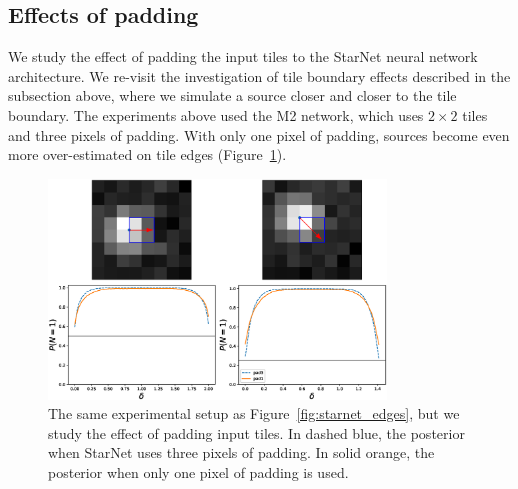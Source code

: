 \subsection{Effects of padding}
We study the effect of padding the input 
tiles to the StarNet neural network architecture. 
We re-visit the investigation of tile boundary effects 
described in the subsection above, where 
we simulate a source closer and closer to the tile boundary. 
The experiments above used the M2 network, 
which uses $2\times 2$ tiles and three pixels of padding. 
With only one pixel of padding, sources become even more 
over-estimated on tile edges (Figure~\ref{fig:starnet_edges_lesspad}). 

\begin{figure}[tb]
    \centering
    \includegraphics[width=0.8\textwidth]{./figures_vg/coverage/edges_example_lesspad.eps}
    \caption{The same experimental setup as Figure~\ref{fig:starnet_edges}, but we 
    study the effect of padding input tiles. 
    In dashed blue, the posterior when 
    StarNet uses three pixels of padding. 
    In solid orange, the posterior when only one pixel of padding is used.
    }
    \label{fig:starnet_edges_lesspad}
\end{figure}
